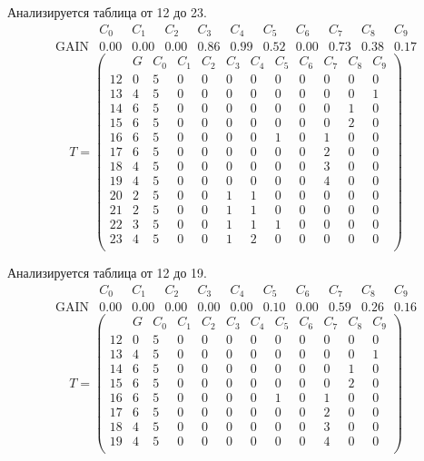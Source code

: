 Анализируется таблица от 12 до 23.
$$ 
\begin{array}{lcccc|c|ccccc}
	  & C_{0} & C_{1} & C_{2} & C_{3} & C_{4} & C_{5} & C_{6} & C_{7} & C_{8} & C_{9}\\
 \textrm{GAIN} & 0.00 & 0.00 & 0.00 & 0.86 & 0.99 & 0.52 & 0.00 & 0.73 & 0.38 & 0.17
\end{array}
 $$
$$
T = \left( \begin{array}{lccccc|c|ccccc}
	 & G & C_{0} & C_{1} & C_{2} & C_{3} & C_{4} & C_{5} & C_{6} & C_{7} & C_{8} & C_{9}\\
	12 & 0 & 5 & 0 & 0 & 0 & 0 & 0 & 0 & 0 & 0 & 0\\
	13 & 4 & 5 & 0 & 0 & 0 & 0 & 0 & 0 & 0 & 0 & 1\\
	14 & 6 & 5 & 0 & 0 & 0 & 0 & 0 & 0 & 0 & 1 & 0\\
	15 & 6 & 5 & 0 & 0 & 0 & 0 & 0 & 0 & 0 & 2 & 0\\
	16 & 6 & 5 & 0 & 0 & 0 & 0 & 1 & 0 & 1 & 0 & 0\\
	17 & 6 & 5 & 0 & 0 & 0 & 0 & 0 & 0 & 2 & 0 & 0\\
	18 & 4 & 5 & 0 & 0 & 0 & 0 & 0 & 0 & 3 & 0 & 0\\
	19 & 4 & 5 & 0 & 0 & 0 & 0 & 0 & 0 & 4 & 0 & 0\\
	20 & 2 & 5 & 0 & 0 & 1 & 1 & 0 & 0 & 0 & 0 & 0\\
	21 & 2 & 5 & 0 & 0 & 1 & 1 & 0 & 0 & 0 & 0 & 0\\
	22 & 3 & 5 & 0 & 0 & 1 & 1 & 1 & 0 & 0 & 0 & 0\\
	23 & 4 & 5 & 0 & 0 & 1 & 2 & 0 & 0 & 0 & 0 & 0\\
\end{array} \right)
$$

Анализируется таблица от 12 до 19.
$$ 
\begin{array}{lccccccc|c|cc}
	  & C_{0} & C_{1} & C_{2} & C_{3} & C_{4} & C_{5} & C_{6} & C_{7} & C_{8} & C_{9}\\
 \textrm{GAIN} & 0.00 & 0.00 & 0.00 & 0.00 & 0.00 & 0.10 & 0.00 & 0.59 & 0.26 & 0.16
\end{array}
 $$
$$
T = \left( \begin{array}{lcccccccc|c|cc}
	 & G & C_{0} & C_{1} & C_{2} & C_{3} & C_{4} & C_{5} & C_{6} & C_{7} & C_{8} & C_{9}\\
	12 & 0 & 5 & 0 & 0 & 0 & 0 & 0 & 0 & 0 & 0 & 0\\
	13 & 4 & 5 & 0 & 0 & 0 & 0 & 0 & 0 & 0 & 0 & 1\\
	14 & 6 & 5 & 0 & 0 & 0 & 0 & 0 & 0 & 0 & 1 & 0\\
	15 & 6 & 5 & 0 & 0 & 0 & 0 & 0 & 0 & 0 & 2 & 0\\
	16 & 6 & 5 & 0 & 0 & 0 & 0 & 1 & 0 & 1 & 0 & 0\\
	17 & 6 & 5 & 0 & 0 & 0 & 0 & 0 & 0 & 2 & 0 & 0\\
	18 & 4 & 5 & 0 & 0 & 0 & 0 & 0 & 0 & 3 & 0 & 0\\
	19 & 4 & 5 & 0 & 0 & 0 & 0 & 0 & 0 & 4 & 0 & 0\\
\end{array} \right)
$$

